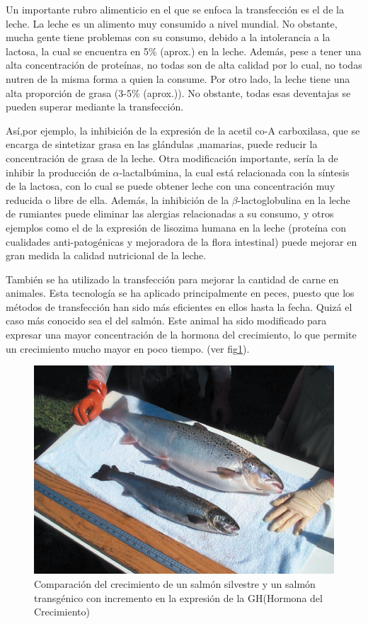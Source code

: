 \documentclass[fleqn,10pt]{SelfArx} %
\begin{document}
Un importante rubro alimenticio en el que se enfoca la transfección es el de la leche. La leche es un alimento muy consumido a nivel mundial. No obstante, mucha gente tiene problemas con su consumo, debido a la intolerancia a la lactosa, la cual se encuentra en 5\% (aprox.) en la leche. Además, pese a tener una alta concentración de proteínas, no todas son de alta calidad por lo cual, no todas nutren de la misma forma a quien la consume. Por otro lado, la leche tiene una alta proporción de grasa (3-5\% (aprox.)). No obstante, todas esas deventajas se pueden superar mediante la transfección\cite{yom1993genetic}. 

Así,por ejemplo, la inhibición de la expresión de la acetil co-A carboxilasa, que se encarga de sintetizar grasa en las glándulas ,mamarias, puede reducir la concentración de grasa de la leche. Otra modificación importante, sería la de inhibir la producción de $\alpha$-lactalbúmina, la cual está relacionada con la síntesis de la lactosa, con lo cual se puede obtener leche con una concentración muy reducida o libre de ella. Además, la inhibición de la $\beta$-lactoglobulina en la leche de rumiantes puede eliminar las alergias relacionadas a su consumo, y otros ejemplos como el de la expresión de lisozima humana en la leche (proteína con cualidades anti-patogénicas y mejoradora de la flora intestinal) puede mejorar en gran medida la calidad nutricional de la leche\cite{yom1993genetic, pintado1998transgenesis, maga2006consumption}.

También se ha utilizado la transfección para mejorar la cantidad de carne en animales. Esta tecnología se ha aplicado principalmente en peces, puesto que los métodos de transfección han sido más eficientes en ellos hasta la fecha. Quizá el caso más conocido sea el del salmón. Este animal ha sido modificado para expresar una mayor concentración de la hormona del crecimiento, lo que permite un crecimiento mucho mayor en poco tiempo. (ver fig\ref{salmon})\cite{berkowitz1994transgenic, ledford2013transgenic}.

\begin{figure}[ht]\centering
\includegraphics[width=\linewidth]{images/salmon}
\caption{Comparación del crecimiento de un salmón silvestre y un salmón transgénico con incremento en la expresión de la GH(Hormona del Crecimiento)\cite{berkowitz1994transgenic, ledford2013transgenic}}
\label{salmon}
\end{figure}
\end{document}
